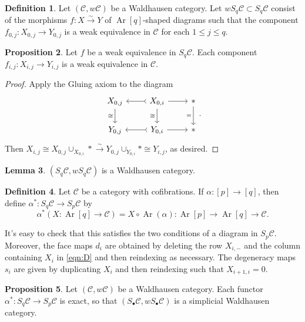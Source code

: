 \documentclass[10pt,letterpaper,cm]{nupset}
\theoremstyle{definition}
\newtheorem{definition}{Definition}
\theoremstyle{theorem}
\newtheorem{lemma}[definition]{Lemma}
\newtheorem{prop}[definition]{Proposition}
\theoremstyle{remark}
\newcommand{\1}{\mathbf{1}}
\renewcommand{\c}{\mathscr{C}}
\newcommand{\0}{\vec 0}
\DeclareMathOperator{\Ar}{Ar}
\begin{document}
\begin{definition}
Let $\left(\c, w{\c}\right)$ be a Waldhausen category. Let $w S_q\c \subset S_q \c$ consist of the morphisms $f: X \overset{\sim}{\longrightarrow} Y$ of $\Ar[q]$-shaped diagrams such that the component $f_{0, j} : X_{0, j} \to Y_{0, j}$ is a weak equivalence in $\c$ for each $1\leq j \leq q$.
\end{definition}

\begin{prop}
Let $f$ be a weak equivalence in $S_q \c$.  Each component $f_{i, j}: X_{i, j} \to Y_{i, j}$ is a weak equivalence in $\c$.
\end{prop}
\begin{proof}
Apply the Gluing axiom to the diagram
\[
\begin{tikzcd}
{X_{0, j}} \arrow[d, "\cong"'] & {X_{0, i}} \arrow[l, tail] \arrow[r] \arrow[d, "\cong"'] & \ast \arrow[d, "="'] \\
{Y_{0, j}} & {Y_{0, i}} \arrow[l, tail] \arrow[r] & \ast
\end{tikzcd}.
\] Then $X_{i, j} \cong X_{0, j} \cup_{X_{0, i}} \ast \overset{\sim}{\longrightarrow} Y_{0, j} \cup_{Y_{0, i}} \ast \cong Y_{i, j}$, as desired.
\end{proof}

\begin{lemma}
$\left(S_q \c, wS_q \c\right)$ is a Waldhausen category. 
\end{lemma}

\begin{definition}
Let $\c$ be a category with cofibrations. If $\alpha : [p] \to [q]$, then define $\alpha^{\ast} : S_q \c \to S_p \c$ by
$$\alpha^{\ast}(X: \Ar[q] \to \c) = X \circ \Ar(\alpha) : \Ar[p] \to \Ar[q] \to \c.$$
\end{definition}

It's easy to check that this satisfies the two conditions of a diagram in $S_p \c$.
Moreover, the face maps $d_i$ are obtained by deleting the row $X_{i, -}$ and the column containing $X_i$ in \eqref{eqn:D} and then reindexing as necessary. The degeneracy maps $s_i$ are given by duplicating $X_i$ and then reindexing such that $X_{i+1, i} =0$.

\begin{prop}
Let $\left(\c, w{\c}\right)$ be a Waldhausen category. Each functor $\alpha^{\ast}: S_q \c \to S_p \c$ is exact, so that $\left(S_{\bullet}\c, wS_{\bullet} \c\right)$ is a simplicial Waldhausen category.
\end{prop}	
\end{document}
